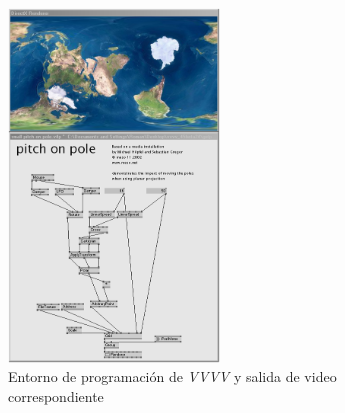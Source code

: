 \begin{figure}[H]
  \centering
    \includegraphics[width=0.5\textwidth]{./Apendices/Cap3_aplicaciones/apps-vvvv.png}
  \caption{Entorno de programación de \emph{VVVV} y salida de video correspondiente}
  \label{fig:Apps-VVVV}
\end{figure}

